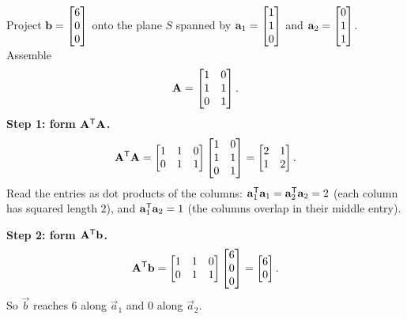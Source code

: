 \begin{example}\label{ch18:plane-worked}
Project $\mathbf{b}=\begin{bmatrix}6\\0\\0\end{bmatrix}$ onto the plane $S$ spanned by
$\mathbf{a}_1=\begin{bmatrix}1\\1\\0\end{bmatrix}$ and $\mathbf{a}_2=\begin{bmatrix}0\\1\\1\end{bmatrix}$. Assemble
\[
  \mathbf{A} = \begin{bmatrix} 1 & 0 \\ 1 & 1 \\ 0 & 1 \end{bmatrix}.
\]
\textbf{Step 1: form $\mathbf{A}^{\mathsf{T}}\mathbf{A}$.}
\[
  \mathbf{A}^{\mathsf{T}}\mathbf{A}
  = \begin{bmatrix} 1 & 1 & 0 \\ 0 & 1 & 1 \end{bmatrix}
    \begin{bmatrix} 1 & 0 \\ 1 & 1 \\ 0 & 1 \end{bmatrix}
  = \begin{bmatrix} 2 & 1 \\ 1 & 2 \end{bmatrix}.
\]
Read the entries as dot products of the columns: $\mathbf{a}_1^{\mathsf{T}}\mathbf{a}_1=\mathbf{a}_2^{\mathsf{T}}\mathbf{a}_2=2$ (each
column has squared length $2$), and $\mathbf{a}_1^{\mathsf{T}}\mathbf{a}_2=1$ (the columns overlap in their middle
entry).

\textbf{Step 2: form $\mathbf{A}^{\mathsf{T}}\mathbf{b}$.}
\[
  \mathbf{A}^{\mathsf{T}}\mathbf{b}
  = \begin{bmatrix} 1 & 1 & 0 \\ 0 & 1 & 1 \end{bmatrix}\begin{bmatrix}6\\0\\0\end{bmatrix}
  = \begin{bmatrix}6\\0\end{bmatrix}.
\]
So $\vec{b}$ reaches $6$ along $\vec{a}_1$ and $0$ along $\vec{a}_2$.


\end{example}
